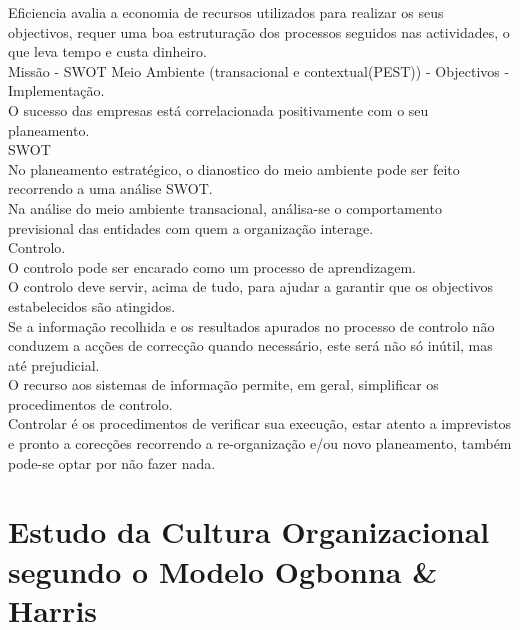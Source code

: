 Eficiencia avalia a economia de recursos utilizados para realizar os seus objectivos, requer uma boa estruturação dos processos seguidos nas actividades, o que leva tempo e custa dinheiro.\\

Missão - SWOT Meio Ambiente (transacional e contextual(PEST)) - Objectivos - Implementação.\\

O sucesso das empresas está correlacionada positivamente com o seu planeamento.\\

SWOT\\

No planeamento estratégico, o dianostico do meio ambiente pode ser feito recorrendo a uma análise SWOT.\\

Na análise do meio ambiente transacional, análisa-se o comportamento previsional das entidades com quem a organização interage.\\

Controlo.\\
O controlo pode ser encarado como um processo de aprendizagem.\\
O controlo deve servir, acima de tudo, para ajudar a garantir que os objectivos estabelecidos são atingidos.\\
Se a informação recolhida e os resultados apurados no processo de controlo não conduzem a acções de correcção quando necessário, este será não só inútil, mas até prejudicial.\\
O recurso aos sistemas de informação permite, em geral, simplificar os procedimentos de controlo.\\

Controlar é os procedimentos de verificar sua execução, estar atento a imprevistos e pronto a corecções recorrendo a re-organização e/ou novo planeamento, também pode-se optar por não fazer nada.\\




\section{Estudo da Cultura Organizacional segundo o Modelo Ogbonna \& Harris}


